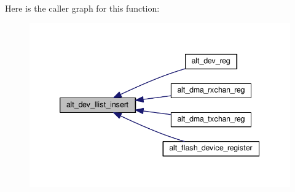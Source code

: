 Here is the caller graph for this function\+:
\nopagebreak
\begin{figure}[H]
\begin{center}
\leavevmode
\includegraphics[width=339pt]{dd/d21/alt__dev__llist_8h_a1c5c3fa576f4308fb670b68a35ba437d_icgraph}
\end{center}
\end{figure}


